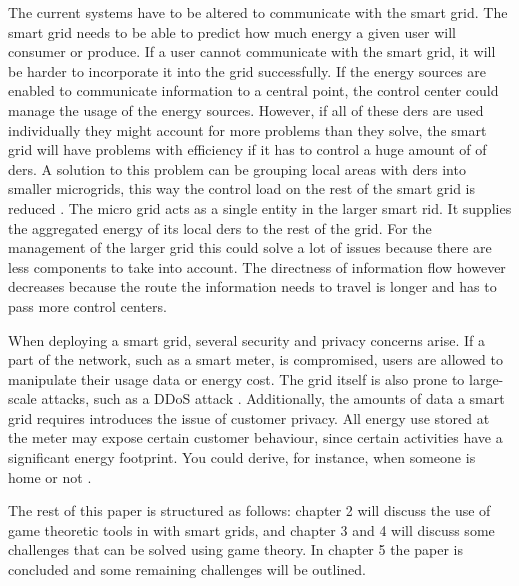 The current systems have to be altered to communicate with the smart grid. The smart grid needs to be able to predict how much energy a given user will consumer or produce. If a user cannot communicate with the smart grid, it will be harder to incorporate it into the grid successfully. If the energy sources are enabled to communicate information to a central point, the control center could manage the usage of the energy sources. However, if all of these \glspl{der} are used individually they might account for more problems than they solve, the smart grid will have problems with efficiency if it has to control a huge amount of of \glspl{der}. A solution to this problem can be grouping local areas with \glspl{der} into smaller microgrids, this way the control load on the rest of the smart grid is reduced \cite{HatziargyriouAsanoIravaniMarnay2007}. The micro grid acts as a single entity in the larger smart rid. It supplies the aggregated energy of its local \glspl{der} to the rest of the grid. For the management of the larger grid this could solve a lot of issues because there are less components to take into account. The directness of information flow however decreases because the route the information needs to travel is longer and has to pass more control centers.  

When deploying a smart grid, several security and privacy concerns arise.  If a part of the network, such as a smart meter, is compromised, users are allowed to manipulate their usage data or energy cost. The grid itself is also prone to large-scale attacks, such as a DDoS attack \cite{McDanielMcLaughlin2009a}. Additionally, the amounts of data a smart grid requires introduces the issue of customer privacy. All energy use stored at the meter may expose certain customer behaviour, since certain activities have a significant energy footprint. You could derive, for instance, when someone is home or not \cite{Molina-MarkhamShenoyFuEtAl2010}.

The rest of this paper is structured as follows: chapter 2 will discuss the use of game theoretic tools in with smart grids, and chapter 3 and 4 will discuss some challenges that can be solved using game theory. In chapter 5 the paper is concluded and some remaining challenges will be outlined.

